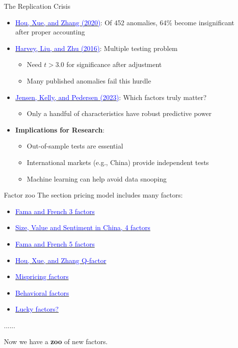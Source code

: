 \documentclass{beamer}
\begin{document}
\begin{frame}{The Replication Crisis}
	\begin{itemize}
		\item \href{https://doi.org/10.1093/rfs/hhy131}{\textcolor{blue}{Hou, Xue, and Zhang (2020)}}: Of 452 anomalies, 64\% become insignificant after proper accounting
		\item \href{https://doi.org/10.1093/rfs/hhv059}{\textcolor{blue}{Harvey, Liu, and Zhu (2016)}}: Multiple testing problem
		\begin{itemize}
			\item Need $t > 3.0$ for significance after adjustment
			\item Many published anomalies fail this hurdle
		\end{itemize}
		\item \href{https://doi.org/10.1111/jofi.13249}{\textcolor{blue}{Jensen, Kelly, and Pedersen (2023)}}: Which factors truly matter?
		\begin{itemize}
			\item Only a handful of characteristics have robust predictive power
		\end{itemize}
		\item \textbf{Implications for Research}:
		\begin{itemize}
			\item Out-of-sample tests are essential
			\item International markets (e.g., China) provide independent tests
			\item Machine learning can help avoid data snooping
		\end{itemize}
	\end{itemize}
\end{frame}

\begin{frame}{Factor zoo}
	The section pricing model includes many factors:
	\begin{itemize}
		\item \href{https://doi.org/10.1016/0304-405X(93)90023-5}{\textcolor{blue}{Fama and French 3 factors}}
		\item \href{https://doi.org/10.1016/j.jfineco.2019.03.008}{\textcolor{blue}{Size, Value and Sentiment in China, 4 factors}}
		\item \href{https://doi.org/10.1016/j.jfineco.2014.10.010}{\textcolor{blue}{Fama and French 5 factors}}
		\item \href{https://doi.org/10.1093/rfs/hhu068}{\textcolor{blue}{Hou, Xue, and Zhang Q-factor}}
		\item \href{https://doi.org/10.1093/rfs/hhw107}{\textcolor{blue}{Mispricing factors}}
		\item \href{https://doi.org/10.1093/rfs/hhz069}{\textcolor{blue}{Behavioral factors}}
		\item \href{https://www.sciencedirect.com/science/article/pii/S0304405X21001410}{\textcolor{blue}{Lucky factors?}}
	\end{itemize}
......

Now we have a \textbf{zoo} of new factors.
\end{frame}
\end{document}
